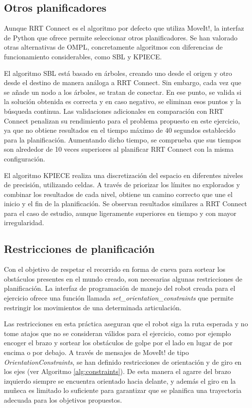 \documentclass[12pt,spanish,chapterprefix, numbers=noenddot]{book}
\numberwithin{equation}{section}
\numberwithin{figure}{section}
\begin{document}
\subsection{Otros planificadores}

Aunque RRT Connect es el algoritmo por defecto que utiliza MoveIt!, la interfaz de Python que ofrece permite seleccionar otros planificadores. Se han valorado otras alternativas de OMPL, concretamente algoritmos con diferencias de funcionamiento considerables, como SBL y KPIECE. 

El algoritmo SBL está basado en árboles, creando uno desde el origen y otro desde el destino de manera análoga a RRT Connect. Sin embargo, cada vez que se añade un nodo a los árboles, se tratan de conectar. En ese punto, se valida si la solución obtenida es correcta y en caso negativo, se eliminan esos puntos y la búsqueda continua. Las validaciones adicionales en comparación con RRT Connect penalizan su rendimiento para el problema propuesto en este ejercicio, ya que no obtiene resultados en el tiempo máximo de 40 segundos establecido para la planificación. Aumentando dicho tiempo, se comprueba que sus tiempos son alrededor de 10 veces superiores al planificar RRT Connect con la misma configuración. 

El algoritmo KPIECE realiza una discretización del espacio en diferentes niveles de precisión, utilizando celdas. A través de priorizar los límites no explorados y combinar los resultados de cada nivel, obtiene un camino correcto que une el inicio y el fin de la planificación. Se observan resultados similares a RRT Connect para el caso de estudio, aunque ligeramente superiores en tiempo y con mayor irregularidad. 

\subsection{Restricciones de planificación}

Con el objetivo de respetar el recorrido en forma de cueva para sortear los obstáculos presentes en el mundo creado, son necesarias algunas restricciones de planificación. La interfaz de programación de manejo del robot creada para el ejercicio ofrece una función llamada \textit{set\_orientation\_constraints} que permite restringir los movimientos de una determinada articulación. 

Las restricciones en esta práctica aseguran que el robot siga la ruta esperada y no tome atajos que no se consideran válidos para el ejercicio, como por ejemplo encoger el brazo y sortear los obstáculos de golpe por el lado en lugar de por encima o por debajo. 
A través de mensajes de MoveIt! de tipo \textit{OrientationConstraints}, se han definido restricciones de orientación y de giro en los ejes (ver Algoritmo \ref{alg:constraints}). De esta manera el agarre del brazo izquierdo siempre se encuentra orientado hacia delante, y además el giro en la muñeca es limitado lo suficiente para garantizar que se planifica una trayectoria adecuada para los objetivos propuestos. 
\end{document}
